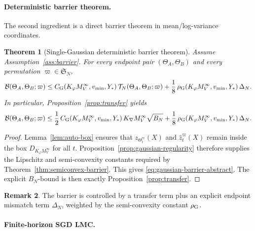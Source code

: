 \documentclass[11pt]{article}
\newtheorem{theorem}{Theorem}[section]
\theoremstyle{definition}
\newtheorem{remark}[theorem]{Remark}
\newcommand{\cB}{\mathcal{B}}
\newcommand{\cT}{\mathcal{T}}
\begin{document}
\paragraph{Deterministic barrier theorem.}

The second ingredient is a direct barrier theorem in mean/log-variance coordinates.

\begin{theorem}[Single-Gaussian deterministic barrier theorem]
\label{thm:barrier}
Assume Assumption~\ref{ass:barrier}. For every endpoint pair
$(\Theta_A,\Theta_B)$ and every permutation $\varpi\in\mathfrak{S}_N$,
\begin{equation}
  \cB(\Theta_A,\Theta_B;\varpi)
  \le
  C_{\rm G}(K_\varphi M_V^\infty,v_{\min},Y_\ast)\,
  \cT_N(\Theta_A,\Theta_B;\varpi)
  +
  \frac18\,
  \rho_{\rm G}(K_\varphi M_V^\infty,v_{\min},Y_\ast)\,
  \Delta_N.
  \label{eq:gaussian-barrier-abstract}
\end{equation}
In particular, Proposition~\ref{prop:transfer} yields
\begin{equation}
  \cB(\Theta_A,\Theta_B;\varpi)
  \le
  \frac12\,
  C_{\rm G}(K_\varphi M_V^\infty,v_{\min},Y_\ast)\,
  K_{\nabla}M_V^\infty\sqrt{B_N}
  +
  \frac18\,
  \rho_{\rm G}(K_\varphi M_V^\infty,v_{\min},Y_\ast)\,
  \Delta_N.
  \label{eq:deterministic-barrier}
\end{equation}
\end{theorem}

\begin{proof}
Lemma~\ref{lem:auto-box} ensures that
$z_{\Theta_t^\varpi}(X)$ and $\hat z_t^\varpi(X)$ remain inside the box
$D_{K_\varphi M_V^\infty}$ for all $t$. Proposition~\ref{prop:gaussian-regularity}
therefore supplies the Lipschitz and semi-convexity constants required by
Theorem~\ref{thm:semiconvex-barrier}. This gives
\eqref{eq:gaussian-barrier-abstract}. The explicit $B_N$-bound is then exactly
Proposition~\ref{prop:transfer}.
\end{proof}

\begin{remark}
The barrier is controlled by a transfer term plus an explicit endpoint
mismatch term $\Delta_N$, weighted by the semi-convexity constant
$\rho_{\rm G}$.
\end{remark}

\paragraph{Finite-horizon SGD LMC.}
\end{document}
